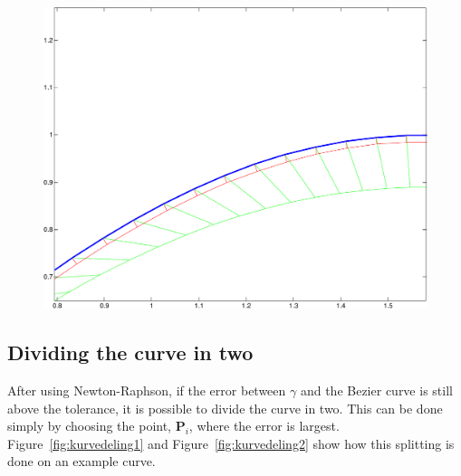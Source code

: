 \documentclass[10pt]{article}
\begin{document}
\begin{figure}[H]
\centering
\begin{minipage}[t]{.43\textwidth}
\vspace{0pt}
    \includegraphics[scale=0.41, clip=true, trim = 0 0 0.9cm 5.5cm]{newtons3-crop.pdf}
\end{minipage}\hfill
\begin{minipage}[t]{.4\textwidth}
\vspace{0pt}
\end{minipage}
\label{fig:Newton-Raphson}
\end{figure}


\subsection*{Dividing the curve in two}
After using Newton-Raphson, if the error between $\gamma$ and the Bezier curve is still above the tolerance, it is possible to divide the curve in two. This can be done simply by choosing the point, $\mathbf{P}_i$, where the error is largest. Figure~\ref{fig:kurvedeling1} and Figure~\ref{fig:kurvedeling2} show how this splitting is done on an example curve. 
\end{document}
